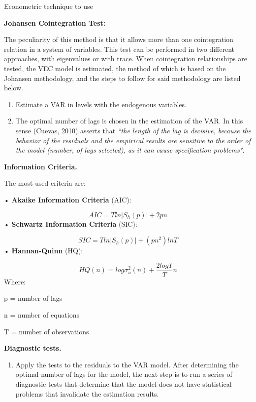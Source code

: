     \frame{\sectionpage}
    \begin{frame}{Econometric technique to use}

\textbf{Johansen Cointegration Test:}\par
The peculiarity of this method is that it allows more than one cointegration relation in a system of variables. This test can be performed in two different approaches, with eigenvalues or with trace. When cointegration relationships are tested, the VEC model is estimated, the method of which is based on the Johansen methodology, and the steps to follow for said methodology are listed below.\par
\begin{enumerate}
\item Estimate a VAR in levels with the endogenous variables.
\item The optimal number of lags is chosen in the estimation of the VAR. In this sense (Cuevas, 2010) asserts that \textit{“the length of the lag is decisive, because the behavior of the residuals and the empirical results are sensitive to the order of the model (number, of lags selected), as it can cause specification problems".} 
\end{enumerate}
\textbf{Information Criteria.}\par
The most used criteria are:\par
• \textbf{Akaike Information Criteria} (AIC):\par
 \begin{equation}
 AIC = Tln|S_{h}(p)|+2pn
 \end{equation}
• \textbf{Schwartz Information Criteria} (SIC):\par
  \begin{equation}
 SIC = Tln|S_{h}(p)|+(pn^2)lnT
 \end{equation}
• \textbf{Hannan-Quinn} (HQ):\par
   \begin{equation}
 HQ(n) = log\sigma^2_{u}(n)+\frac{2logT}{T}n
 \end{equation}
Where:\par
p = number of lags\par
n = number of equations\par
T = number of observations\par
\textbf{Diagnostic tests.}\par
\begin{enumerate}
\item Apply the tests to the residuals to the VAR model. After determining the optimal number of lags for the model, the next step is to run a series of diagnostic tests that determine that the model does not have statistical problems that invalidate the estimation results.\par

\end{enumerate}
\end{frame}
